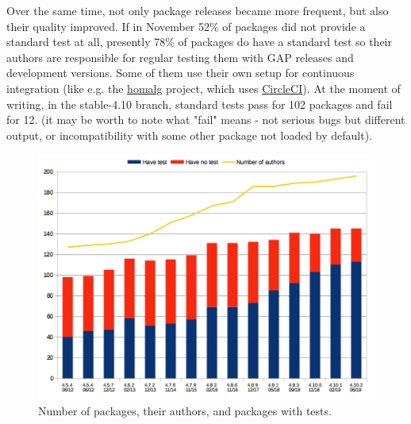 \documentclass{deliverablereport}
\begin{document}
Over the same time, not only package releases became more frequent, but also their quality
improved. If in November 52\% of packages did not provide a standard 
test at all, presently 78\% of packages do have a standard test 
so their authors are responsible for regular testing them 
with GAP releases and development versions.
Some of them use their own setup for continuous integration
(like e.g. the \href{https://homalg-project.github.io/}{\sf homalg} project,
which uses \href{https://circleci.com/}{CircleCI}).
At the moment of writing, in the stable-4.10 branch,
standard tests pass for 102 packages
and fail for 12.
(it may be worth to note what "fail" means - not serious bugs
but different output, or incompatibility with some other package
not loaded by default).


\begin{figure}[!ht]
    \centering
    \includegraphics[width=\textwidth]{images/gap-package-tests}
    \caption{Number of \GAP packages, their authors, and packages with tests.}
    \label{fig:gap-package-tests}
\end{figure}
\end{document}
